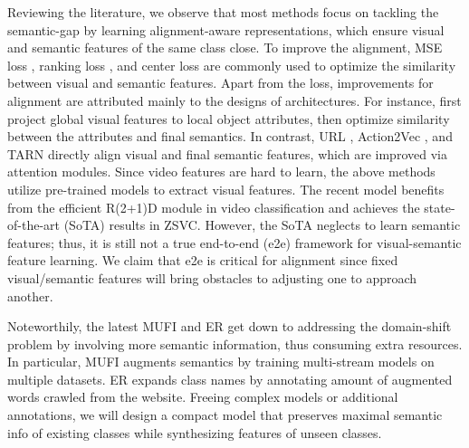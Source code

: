\documentclass[10pt,twocolumn,letterpaper]{article}
\begin{document}
Reviewing the literature, we observe that most methods focus on tackling the semantic-gap by learning alignment-aware representations, which ensure visual and semantic features of the same class close.
To improve the alignment, MSE loss \cite{brattoli2020rethinking}, ranking loss \cite{hahn2019action2vec}, and center loss \cite{gao2020learning} are commonly used to optimize the similarity between visual and semantic features. 
Apart from the loss, improvements for alignment are attributed mainly to the designs of architectures.
For instance, \cite{jain2015objects2action,gao2020learning,mettes2021object} first project global visual features to local object attributes, then optimize similarity between the attributes and final semantics.
In contrast, URL \cite{zhu2018towards}, Action2Vec \cite{hahn2019action2vec}, and TARN \cite{bishay2019tarn} directly align visual and final semantic features, which are improved via attention modules.
Since video features are hard to learn, the above methods utilize pre-trained models to extract visual features.
The recent model \cite{brattoli2020rethinking} benefits from the efficient R(2+1)D module \cite{tran2018closer} in video classification and achieves the state-of-the-art (SoTA) results in ZSVC.
However, the SoTA \cite{brattoli2020rethinking} neglects to learn semantic features; thus, it is still not a true end-to-end (e2e) framework for visual-semantic feature learning.
We claim that e2e is critical for alignment since fixed visual/semantic features will bring obstacles to adjusting one to approach another.

Noteworthily, the latest MUFI \cite{qiu2021boosting} and ER \cite{chen2021elaborative} get down to addressing the domain-shift problem by involving more semantic information, thus consuming extra resources.
In particular, MUFI \cite{qiu2021boosting} augments semantics by training multi-stream models on multiple datasets.
ER \cite{chen2021elaborative} expands class names by annotating amount of augmented words crawled from the website.
Freeing complex models or additional annotations, we will design a compact model that preserves maximal semantic info of existing classes while synthesizing features of unseen classes.
\end{document}
